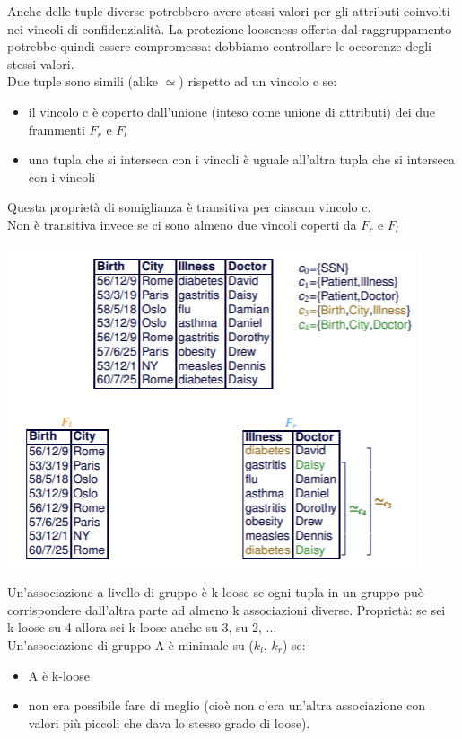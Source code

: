 Anche delle tuple diverse potrebbero avere stessi valori per gli attributi coinvolti nei vincoli di confidenzialità. La protezione looseness offerta dal raggruppamento potrebbe quindi essere compromessa: dobbiamo controllare le occorenze degli stessi valori.\\
Due tuple sono simili (alike \(\simeq\)) rispetto ad un vincolo c se:
\begin{itemize}
    \item il vincolo c è coperto dall'unione (inteso come unione di attributi) dei due frammenti \(F_r\) e \(F_l\)
    \item una tupla che si interseca con i vincoli è uguale all'altra tupla che si interseca con i vincoli
\end{itemize}
Questa proprietà di somiglianza è transitiva per ciascun vincolo c.\\
Non è transitiva invece se ci sono almeno due vincoli coperti da \(F_r\) e \(F_l\)
\begin{center}
    \includegraphics[scale=0.8]{img/alikeness.png}
\end{center}
Un'associazione a livello di gruppo è k-loose se ogni tupla in un gruppo può corrispondere dall’altra parte ad almeno k associazioni diverse. Proprietà: se sei k-loose su 4 allora sei k-loose anche su 3, su 2, ... \\
Un'associazione di gruppo A è minimale su (\(k_l\), \(k_r\)) se:
\begin{itemize}
    \item A è k-loose
    \item non era possibile fare di meglio (cioè non c’era un’altra associazione con valori più piccoli che dava lo stesso grado di loose).
\end{itemize}

